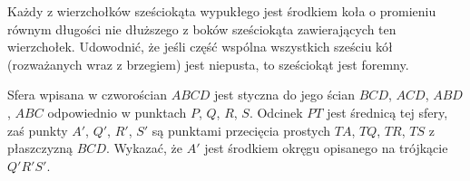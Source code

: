 \begin{exercise}[LX/3/1]
    Każdy z wierzchołków sześciokąta wypukłego jest środkiem koła o promieniu równym długości nie dłuższego z boków sześciokąta zawierających ten wierzchołek.
    Udowodnić, że jeśli część wspólna wszystkich sześciu kół (rozważanych wraz z brzegiem) jest niepusta, to sześciokąt jest foremny.
\end{exercise}

\begin{exercise}[LX/3/5]
    Sfera wpisana w czworościan $ABCD$ jest styczna do jego ścian $BCD$, $ACD$, $ABD$, $ABC$ odpowiednio w punktach $P$, $Q$, $R$, $S$.
    Odcinek $PT$ jest średnicą tej sfery, zaś punkty $A'$, $Q'$, $R'$, $S'$ są punktami przecięcia prostych $TA$, $TQ$, $TR$, $TS$ z płaszczyzną $BCD$.
    Wykazać, że $A'$ jest środkiem okręgu opisanego na trójkącie $Q'R'S'$.
\end{exercise}